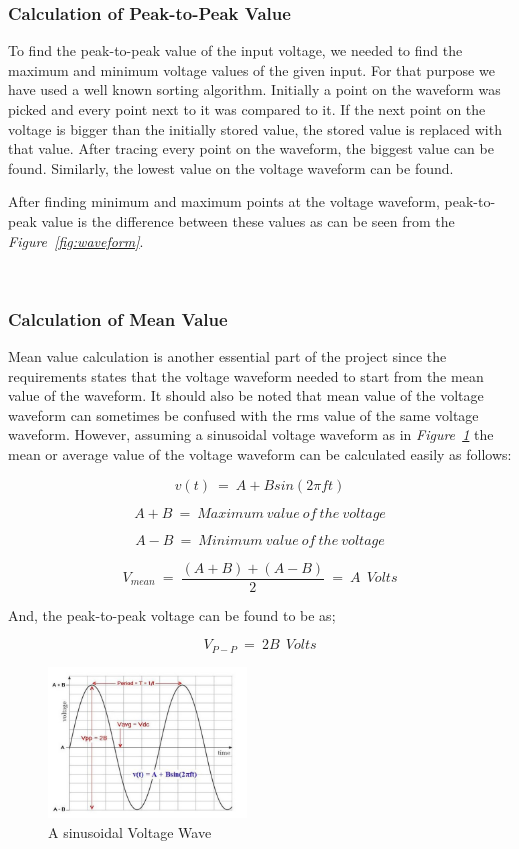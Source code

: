 \documentclass[paper]{IEEEtran}
\begin{document}
\subsubsection{Calculation of Peak-to-Peak Value }	
\- \indent
	To find the peak-to-peak value of the input voltage, we needed to find the maximum and minimum voltage values of the given input. For that purpose we have used a well known sorting algorithm. Initially a point on the waveform was picked and every point next to it was compared to it. If the next point on the voltage is bigger than the initially stored value, the stored value is replaced with that value. After tracing every point on the waveform, the biggest value can be found. Similarly, the lowest value on the voltage waveform can be found. 
	
	After finding minimum and maximum points at the voltage waveform, peak-to-peak value is the difference between these values as can be seen from the \textit{Figure~\ref{fig:waveform}}.  	
	
\-\\
	
\subsubsection{Calculation of Mean Value}
\- \indent

	Mean value calculation is another essential part of the project since the requirements states that the voltage waveform needed to start from the mean value of the waveform. It should also be noted that mean value of the voltage waveform can sometimes be confused with the rms value of the same voltage waveform. However, assuming a sinusoidal voltage waveform as in \textit{Figure~\ref{fig:sinvolt}} the mean or average value of the voltage waveform can be calculated easily as follows:
	
	$$	v(t)~=~A+Bsin(2 \pi ft)	$$	
	
	$$	A+B~=~Maximum~value~of~the~voltage 	$$

	$$	A-B~=~Minimum~value~of~the~voltage 	$$
	
	$$	V_{mean}~=~\frac{(A+B)+(A-B)}{2}~=~A~~Volts	$$	
	
	And, the peak-to-peak voltage can be found to be as;		
		
	$$ 	V_{P-P}~=~2B~~Volts	$$

\begin{figure}[h!]
	\setlength{\unitlength}{\textwidth}
	\center 
	\includegraphics[width=0.47\textwidth]{voltage2}
	\caption{\label{fig:sinvolt} A sinusoidal Voltage Wave}
\end{figure}
\end{document}
